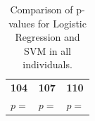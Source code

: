 \newpage

     \begin{table}[h]

        \centering
        \setlength\arrayrulewidth{0.8pt}

        \begin{tabular}{| >{\centering\arraybackslash}m{0.9in} |  >{\centering\arraybackslash}m{0.9in} | >{\centering\arraybackslash}m{0.9in} |}

        	\hline
        	\rowcolor{RoyalBlue}
        	\multicolumn{3}{| >{\centering\arraybackslash}m{3.054in} |}{\textbf{Logistic Regression against SVM}} \\
            \hline
            \rowcolor{RoyalBlue}
            \textbf{104} & \textbf{107} & \textbf{110} \\
            \hline
            $p = $ & $p = $ & $p = $ \\
            \hline

        \end{tabular}

        \caption{Comparison of p-values for Logistic Regression and \acs{SVM} in all individuals.}\label{table:models_kruskal}

    \end{table}








